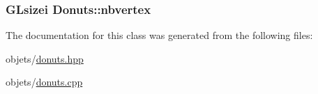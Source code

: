 \hypertarget{class_donuts_aac0118d276a512d287a9bc1f4c7d249d}{
\subsubsection[{nbvertex}]{\setlength{\rightskip}{0pt plus 5cm}G\+Lsizei Donuts\+::nbvertex\hspace{0.3cm}{\ttfamily [private]}}}\label{class_donuts_aac0118d276a512d287a9bc1f4c7d249d}


The documentation for this class was generated from the following files\+:\begin{DoxyCompactItemize}
\item 
objets/\hyperlink{donuts_8hpp}{donuts.\+hpp}\item 
objets/\hyperlink{donuts_8cpp}{donuts.\+cpp}\end{DoxyCompactItemize}

